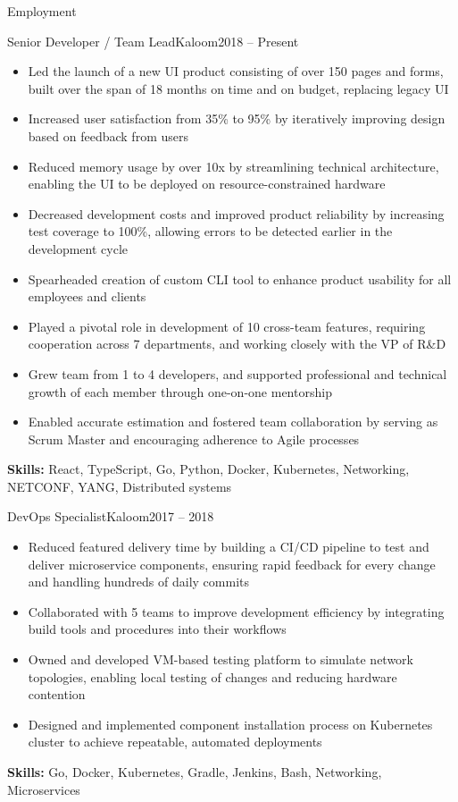 \documentclass[]{cv}
\begin{document}
	\makeheader

	\begin{cvsection}{Employment}
		\begin{cvsubsection}{Senior Developer / Team Lead}{Kaloom}{2018 -- Present}
			\begin{itemize}
				\item Led the launch of a new UI product consisting of over 150 pages and forms, built over the span of 18 months on time and on budget, replacing legacy UI
				\item Increased user satisfaction from 35\% to 95\% by iteratively improving design based on feedback from users
				\item Reduced memory usage by over 10x by streamlining technical architecture, enabling the UI to be deployed on resource-constrained hardware
				\item Decreased development costs and improved product reliability by increasing test coverage to 100\%, allowing errors to be detected earlier in the development cycle
				\item Spearheaded creation of custom CLI tool to enhance product usability for all employees and clients
				\item Played a pivotal role in development of 10 cross-team features, requiring cooperation across 7 departments, and working closely with the VP of R\&D
				\item Grew team from 1 to 4 developers, and supported professional and technical growth of each member through one-on-one mentorship
				\item Enabled accurate estimation and fostered team collaboration by serving as Scrum Master and encouraging adherence to Agile processes
			\end{itemize}
			\small{\textbf{Skills:} React, TypeScript, Go, Python, Docker, Kubernetes, Networking, NETCONF, YANG, Distributed systems}
		\end{cvsubsection}

		\begin{cvsubsection}{DevOps Specialist}{Kaloom}{2017 -- 2018}
			\begin{itemize}
				\item Reduced featured delivery time by building a CI/CD pipeline to test and deliver microservice components, ensuring rapid feedback for every change and handling hundreds of daily commits
				\item Collaborated with 5 teams to improve development efficiency by integrating build tools and procedures into their workflows
				\item Owned and developed VM-based testing platform to simulate network topologies, enabling local testing of changes and reducing hardware contention
				\item Designed and implemented component installation process on Kubernetes cluster to achieve repeatable, automated deployments
			\end{itemize}
			\small{\textbf{Skills:} Go, Docker, Kubernetes, Gradle, Jenkins, Bash, Networking, Microservices}
		\end{cvsubsection}


\end{cvsection}
\end{document}
